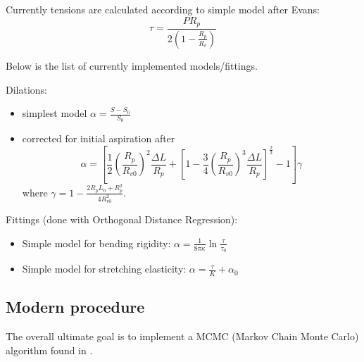 Currently tensions are calculated according to simple model after Evans:
\begin{equation}
\tau = \frac{P R_p}{2\left(1-\frac{R_p}{R_v}\right)}
\label{eq:tau-evans}
\end{equation}

Below is the list of currently implemented models/fittings.

Dilations:
\begin{itemize}
	\item simplest model $\alpha = \frac{S-S_0}{S_0}$
	\item corrected for initial aspiration after \cite{Henriksen2004}
	\begin{equation}
		\alpha = \left[
		 \frac{1}{2} \left(\frac{R_p}{R_{v0}}\right)^2 \frac{\Delta L}{R_p} 
		 + \left[1-\frac{3}{4}\left(\frac{R_p}{R_{v0}}\right)^3 \frac{\Delta L}{R_p} \right]^{\frac{2}{3}}
		 - 1 
		\right]\gamma
		\label{eq:alpha-henriksen}
	\end{equation}
	where $\displaystyle{\gamma = 1-\frac{2R_p L_0+R_p^2}{4R_{v0}^2}}$.
\end{itemize}

Fittings (done with Orthogonal Distance Regression):
\begin{itemize}
	\item Simple model for bending rigidity: $\alpha=\frac{1}{8\pi\kappa}\ln{\frac{\tau}{\tau_0}}$
	\item Simple model for stretching elasticity: $\alpha=\frac{\tau}{K}+\alpha_0$
\end{itemize}

\subsection{Modern procedure}
The overall ultimate goal is to implement a MCMC (Markov Chain Monte Carlo) algorithm found in  \cite{Henriksen2004}.
